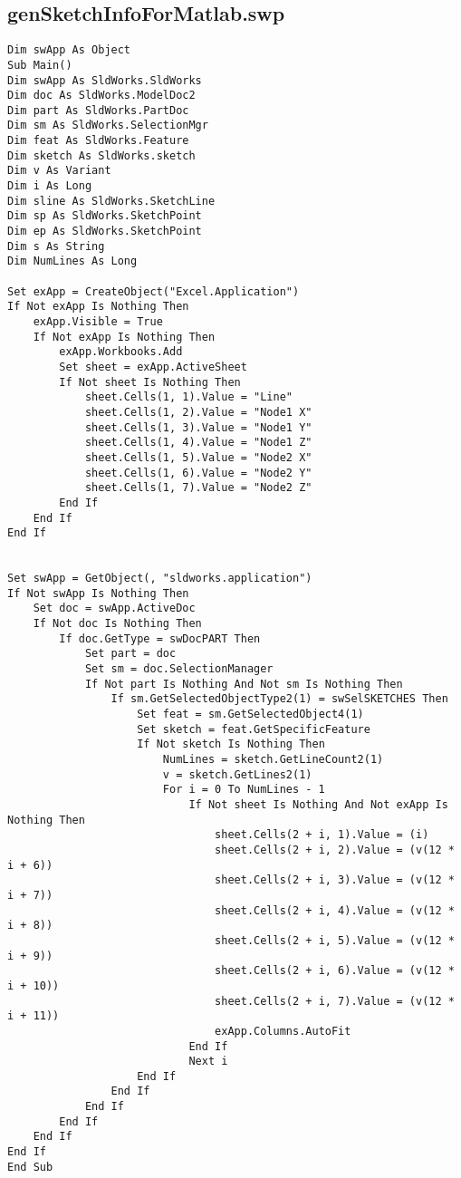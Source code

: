 		\subsection{genSketchInfoForMatlab.swp}
\begin{lstlisting}
Dim swApp As Object
Sub Main()
Dim swApp As SldWorks.SldWorks
Dim doc As SldWorks.ModelDoc2
Dim part As SldWorks.PartDoc
Dim sm As SldWorks.SelectionMgr
Dim feat As SldWorks.Feature
Dim sketch As SldWorks.sketch
Dim v As Variant
Dim i As Long
Dim sline As SldWorks.SketchLine
Dim sp As SldWorks.SketchPoint
Dim ep As SldWorks.SketchPoint
Dim s As String
Dim NumLines As Long

Set exApp = CreateObject("Excel.Application")
If Not exApp Is Nothing Then
	exApp.Visible = True
	If Not exApp Is Nothing Then
		exApp.Workbooks.Add
		Set sheet = exApp.ActiveSheet
		If Not sheet Is Nothing Then
			sheet.Cells(1, 1).Value = "Line"
			sheet.Cells(1, 2).Value = "Node1 X"
			sheet.Cells(1, 3).Value = "Node1 Y"
			sheet.Cells(1, 4).Value = "Node1 Z"
			sheet.Cells(1, 5).Value = "Node2 X"
			sheet.Cells(1, 6).Value = "Node2 Y"
			sheet.Cells(1, 7).Value = "Node2 Z"
		End If
	End If
End If


Set swApp = GetObject(, "sldworks.application")
If Not swApp Is Nothing Then
	Set doc = swApp.ActiveDoc
	If Not doc Is Nothing Then
		If doc.GetType = swDocPART Then
			Set part = doc
			Set sm = doc.SelectionManager
			If Not part Is Nothing And Not sm Is Nothing Then
				If sm.GetSelectedObjectType2(1) = swSelSKETCHES Then
					Set feat = sm.GetSelectedObject4(1)
					Set sketch = feat.GetSpecificFeature
					If Not sketch Is Nothing Then
						NumLines = sketch.GetLineCount2(1)
						v = sketch.GetLines2(1)
						For i = 0 To NumLines - 1
							If Not sheet Is Nothing And Not exApp Is Nothing Then
								sheet.Cells(2 + i, 1).Value = (i)
								sheet.Cells(2 + i, 2).Value = (v(12 * i + 6))
								sheet.Cells(2 + i, 3).Value = (v(12 * i + 7))
								sheet.Cells(2 + i, 4).Value = (v(12 * i + 8))
								sheet.Cells(2 + i, 5).Value = (v(12 * i + 9))
								sheet.Cells(2 + i, 6).Value = (v(12 * i + 10))
								sheet.Cells(2 + i, 7).Value = (v(12 * i + 11))
								exApp.Columns.AutoFit
							End If
							Next i
					End If
				End If
			End If
		End If
	End If
End If
End Sub
\end{lstlisting}			
